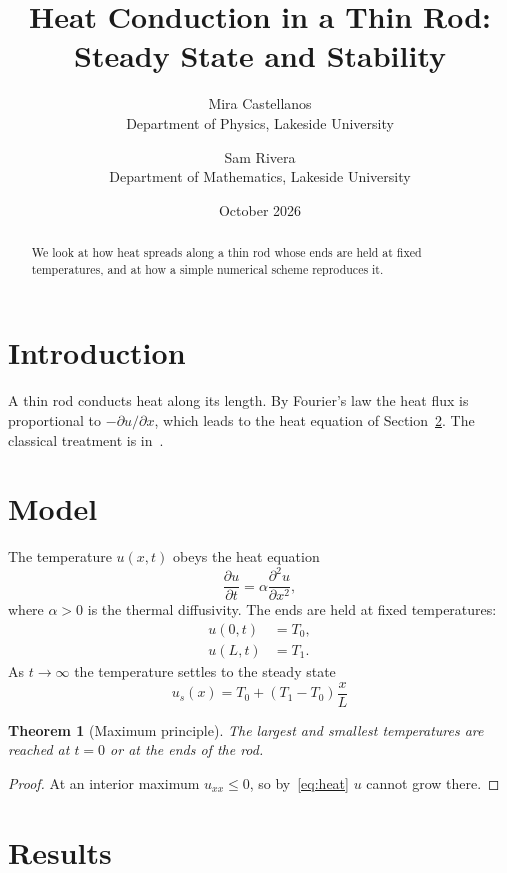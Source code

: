 \documentclass[11pt,a4paper]{article}
\title{Heat Conduction in a Thin Rod: Steady State and Stability}
\author{Mira Castellanos\\ \small Department of Physics, Lakeside University \and Sam Rivera\\ \small Department of Mathematics, Lakeside University}
\date{October 2026}
\newtheorem{theorem}{Theorem}
\begin{document}
\maketitle

\begin{abstract}
We look at how heat spreads along a thin rod whose ends are held at fixed temperatures, and at how a simple numerical scheme reproduces it.
\end{abstract}

\section{Introduction}\label{sec:intro}

A thin rod conducts heat along its length. By Fourier's law the heat flux is proportional to $-\partial u/\partial x$, which leads to the heat equation of Section~\ref{sec:model}. The classical treatment is in~\cite{carslaw1959}.

\section{Model}\label{sec:model}

The temperature $u(x,t)$ obeys the heat equation
\begin{equation}
  \frac{\partial u}{\partial t}=\alpha\frac{\partial^{2}u}{\partial x^{2}},
  \label{eq:heat}
\end{equation}
where $\alpha>0$ is the thermal diffusivity. The ends are held at fixed temperatures:
\begin{align}
  u(0,t) &=T_{0}, \label{eq:bc0} \\
  u(L,t) &=T_{1}. \label{eq:bc1}
\end{align}
As $t\to\infty$ the temperature settles to the steady state
\begin{equation}
  u_{s}(x)=T_{0}+(T_{1}-T_{0})\frac{x}{L}
  \label{eq:4}
\end{equation}

\begin{theorem}[{Maximum principle}]\label{thm:max}
  The largest and smallest temperatures are reached at $t=0$ or at the ends of the rod.
\end{theorem}

\begin{proof}
  At an interior maximum $u_{xx}\leq0$, so by~\eqref{eq:heat} $u$ cannot grow there.
\end{proof}

\section{Results}\label{sec:results}
\end{document}

